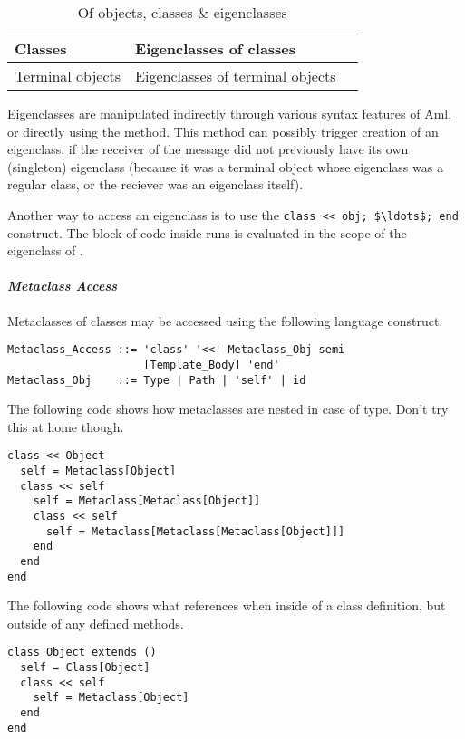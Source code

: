 \begin{table}[ht]
  \centering
  \caption{Of objects, classes \& eigenclasses}
  \renewcommand{\arraystretch}{1.7}
  \begin{tabular}{ | >{\centering}m{3.5cm} | >{\centering}m{3.5cm} | >{\centering\arraybackslash}m{6cm} | }
  	\hline
    Classes & Eigenclasses of classes & \multirow{2}{*}{Eigenclasses of eigenclasses} \\ \cline{1-2}
    Terminal objects & Eigenclasses of terminal objects & \\
    \hline
  \end{tabular}
\end{table}

Eigenclasses are manipulated indirectly through various syntax features of Aml, or directly using the  method. This method can possibly trigger creation of an eigenclass, if the receiver of the  message did not previously have its own (singleton) eigenclass (because it was a terminal object whose eigenclass was a regular class, or the reciever was an eigenclass itself). 

Another way to access an eigenclass is to use the \lstinline!class << obj; $\ldots$; end! construct. The block of code inside runs is evaluated in the scope of the eigenclass of . 

\paragraph{\em Metaclass Access}
Metaclasses of classes may be accessed using the following language construct. 

\grammar\begin{lstlisting}
Metaclass_Access ::= 'class' '<<' Metaclass_Obj semi 
                     [Template_Body] 'end'
Metaclass_Obj    ::= Type | Path | 'self' | id
\end{lstlisting}

\example The following code shows how metaclasses are nested in case of  type. Don't try this at home though. 
\begin{lstlisting}
class << Object
  self = Metaclass[Object]
  class << self
    self = Metaclass[Metaclass[Object]]
    class << self
      self = Metaclass[Metaclass[Metaclass[Object]]]
    end
  end
end
\end{lstlisting}

\example The following code shows what  references when inside of a class definition, but outside of any defined methods. 
\begin{lstlisting}
class Object extends ()
  self = Class[Object]
  class << self
    self = Metaclass[Object]
  end
end
\end{lstlisting}

